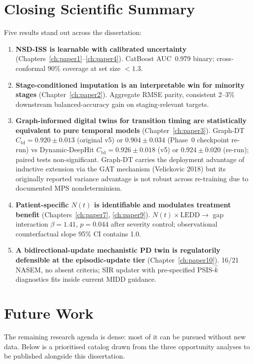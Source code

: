 \section{Closing Scientific Summary}
\label{sec:conc-summary}

Five results stand out across the dissertation:

\begin{enumerate}
\item \textbf{NSD-ISS is learnable with calibrated uncertainty} (Chapters~\ref{ch:paper1}--\ref{ch:paper4}). CatBoost AUC~0.979 binary; cross-conformal 90\% coverage at set size $<1.3$.
\item \textbf{Stage-conditioned imputation is an inter\-pret\-able win for minority stages} (Chapter~\ref{ch:paper2}). Aggregate RMSE parity, consistent 2--3\% downstream balanced-accuracy gain on staging-relevant targets.
\item \textbf{Graph-informed digital twins for transition timing are statistically equivalent to pure temporal models} (Chapter~\ref{ch:paper3}). Graph-DT $C_\text{td} = 0.920 \pm 0.013$ (original v5) or $0.904 \pm 0.034$ (Phase~0 checkpoint re-run) vs Dynamic-DeepHit $C_\text{td} = 0.926 \pm 0.018$ (v5) or $0.924 \pm 0.020$ (re-run); paired tests non-significant. Graph-DT carries the deployment advantage of inductive extension via the GAT mechanism (Velickovic 2018) but its originally reported variance advantage is not robust across re-training due to documented MPS nondeterminism.
\item \textbf{Patient-specific $N(t)$ is identifiable and modulates treatment benefit} (Chapters~\ref{ch:paper7}, \ref{ch:paper9}). $N(t) \times \mathrm{LEDD} \to$ gap interaction $\beta = 1.41$, $p = 0.044$ after severity control; observational counterfactual slope 95\% CI contains 1.0.
\item \textbf{A bidirectional-update mechanistic PD twin is regulatorily defensible at the episodic-update tier} (Chapter~\ref{ch:paper10}). 16/21 NASEM, no absent criteria; SIR updater with pre-specified PSIS-$\hat{k}$ diagnostics fits inside current MIDD guidance.
\end{enumerate}

\section{Future Work}
\label{sec:conc-future}

The remaining research agenda is dense: most of it can be pursued without new data. Below is a prioritised catalog drawn from the three opportunity analyses to be published alongside this dissertation.

